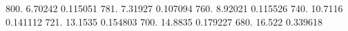 800.	6.70242	0.115051
781.	7.31927	0.107094
760.	8.92021	0.115526
740.	10.7116	0.141112
721.	13.1535	0.154803
700.	14.8835	0.179227
680.	16.522	0.339618
